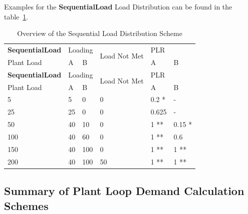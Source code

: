 Examples for the \textbf{SequentialLoad} Load Distribution can be found in the table~\ref{tab:sequantial-load-overview}.

\begin{longtable}[c]{|l|p{0.5in}|p{0.5in}|l|p{0.5in}|p{0.5in}|}

\caption{Overview of the Sequential Load Distribution Scheme}
\label{tab:sequantial-load-overview}\\
\hline

\textbf{SequentialLoad} & \multicolumn{2}{l|}{Loading} & \multirow{2}{*}{Load Not Met} & \multicolumn{2}{l|}{PLR} \\ \cline{1-3} \cline{5-6}
Plant Load      & A             & B            &                               & A          & B           \\ \hline
\endfirsthead
\hline
\textbf{SequentialLoad} & \multicolumn{2}{l|}{Loading} & \multirow{2}{*}{Load Not Met} & \multicolumn{2}{l|}{PLR} \\ \cline{1-3} \cline{5-6}
Plant Load      & A             & B            &                               & A          & B           \\ \hline
\endhead

5               & 5             & 0            & 0                             & 0.2 *      & -           \\ \hline
25              & 25            & 0            & 0                             & 0.625      & -           \\ \hline
50              & 40            & 10           & 0                             & 1 **       & 0.15 *      \\ \hline
100             & 40            & 60           & 0                             & 1 **       & 0.6         \\ \hline
150             & 40           & 100           & 0                             & 1 **       & 1 **        \\ \hline
200             & 40           & 100           & 50                            & 1 **       & 1 **        \\ \hline
\end{longtable}


\subsection{Summary of Plant Loop Demand Calculation Schemes}\label{summary-of-plant-loop-demand-calculation-schemes}

